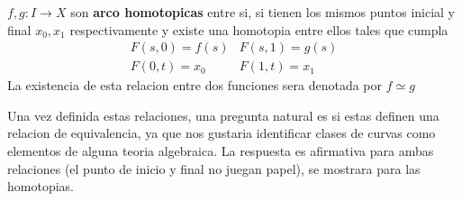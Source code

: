 \begin{definicion}
  \(f,g : I \to X\) son \textbf{arco homotopicas} entre si, si tienen los mismos
  puntos inicial y final \(x_0, x_1\) respectivamente y existe una homotopia entre
  ellos tales que cumpla
  \[
    \begin{matrix}
      F(s,0) = f(s) & F(s,1) = g(s) \\
      F(0,t) = x_0  & F(1,t) = x_1
    \end{matrix}
  \]
  La existencia de esta relacion entre dos funciones sera denotada por
  \(f \simeq g\)
\end{definicion}
Una vez definida estas relaciones, una pregunta natural es si estas definen
una relacion de equivalencia, ya que nos gustaria identificar clases de
curvas como elementos de alguna teoria algebraica. La respuesta es
afirmativa para ambas relaciones (el punto de inicio y final no juegan
papel), se mostrara para las homotopias.

